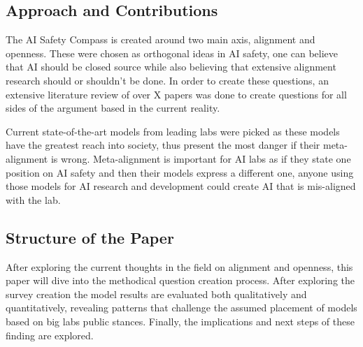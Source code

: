\subsection{Approach and Contributions}

The AI Safety Compass is created around two main axis, alignment and openness. These were chosen as orthogonal ideas in AI safety, one can believe that AI should be closed source while also believing that extensive alignment research should or shouldn't be done. In order to create these questions, an extensive literature review of over X papers was done to create questions for all sides of the argument based in the current reality. 

Current state-of-the-art models from leading labs were picked as these models have the greatest reach into society, thus present the most danger if their meta-alignment is wrong. Meta-alignment is important for AI labs as if they state one position on AI safety and then their models express a different one, anyone using those models for AI research and development could create AI that is mis-aligned with the lab.

\subsection{Structure of the Paper}

After exploring the current thoughts in the field on alignment and openness, this paper will dive into the methodical question creation process. After exploring the survey creation the model results are evaluated both qualitatively and quantitatively, revealing patterns that challenge the assumed placement of models based on big labs public stances. Finally, the implications and next steps of these finding are explored.


